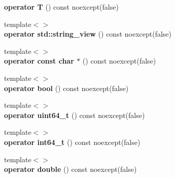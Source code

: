 \begin{DoxyCompactItemize}
\item 
\mbox{\label{classsimdjson_1_1document_1_1element__result_aeff0c243e042a78e41e9e85bca759084}} 
{\bfseries operator T} () const noexcept(false)
\item 
\mbox{\label{classsimdjson_1_1document_1_1element__result_a3fb4a3635266f0151a5b4092e0babf35}} 
{\footnotesize template$<$$>$ }\\{\bfseries operator std\+::string\+\_\+view} () const noexcept(false)
\item 
\mbox{\label{classsimdjson_1_1document_1_1element__result_a1a858810981e7dfa7701e5651e934d57}} 
{\footnotesize template$<$$>$ }\\{\bfseries operator const char $\ast$} () const noexcept(false)
\item 
\mbox{\label{classsimdjson_1_1document_1_1element__result_aa173ed15285853e98ff5fcacfa28153d}} 
{\footnotesize template$<$$>$ }\\{\bfseries operator bool} () const noexcept(false)
\item 
\mbox{\label{classsimdjson_1_1document_1_1element__result_ae3e112497de80c13e96700c96b8ab49d}} 
{\footnotesize template$<$$>$ }\\{\bfseries operator uint64\+\_\+t} () const noexcept(false)
\item 
\mbox{\label{classsimdjson_1_1document_1_1element__result_a607e277a1345ae62aa8054317d3c1a79}} 
{\footnotesize template$<$$>$ }\\{\bfseries operator int64\+\_\+t} () const noexcept(false)
\item 
\mbox{\label{classsimdjson_1_1document_1_1element__result_a7d340ea0e84633858fc0140d79df4d47}} 
{\footnotesize template$<$$>$ }\\{\bfseries operator double} () const noexcept(false)
\end{DoxyCompactItemize}
